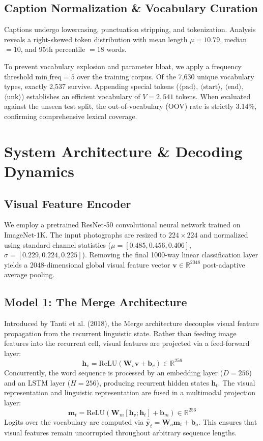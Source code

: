 \documentclass[conference]{IEEEtran}
\begin{document}
\subsection{Caption Normalization \& Vocabulary Curation}
Captions undergo lowercasing, punctuation stripping, and tokenization. Analysis reveals a right-skewed token distribution with mean length $\mu = 10.79$, median $= 10$, and 95th percentile $= 18$ words.

To prevent vocabulary explosion and parameter bloat, we apply a frequency threshold $\text{min\_freq} = 5$ over the training corpus. Of the 7,630 unique vocabulary types, exactly 2,537 survive. Appending special tokens ($\langle\text{pad}\rangle$, $\langle\text{start}\rangle$, $\langle\text{end}\rangle$, $\langle\text{unk}\rangle$) establishes an efficient vocabulary of $V = 2,541$ tokens. When evaluated against the unseen test split, the out-of-vocabulary (OOV) rate is strictly 3.14\%, confirming comprehensive lexical coverage.

\section{System Architecture \& Decoding Dynamics}
\subsection{Visual Feature Encoder}
We employ a pretrained ResNet-50 convolutional neural network trained on ImageNet-1K. The input photographs are resized to $224 \times 224$ and normalized using standard channel statistics ($\mu = [0.485, 0.456, 0.406]$, $\sigma = [0.229, 0.224, 0.225]$). Removing the final 1000-way linear classification layer yields a 2048-dimensional global visual feature vector $\mathbf{v} \in \mathbb{R}^{2048}$ post-adaptive average pooling.

\subsection{Model 1: The Merge Architecture}
Introduced by Tanti et al. (2018), the Merge architecture decouples visual feature propagation from the recurrent linguistic state. Rather than feeding image features into the recurrent cell, visual features are projected via a feed-forward layer:
\begin{equation}
\mathbf{h}_v = \text{ReLU}(\mathbf{W}_v \mathbf{v} + \mathbf{b}_v) \in \mathbb{R}^{256}
\end{equation}
Concurrently, the word sequence is processed by an embedding layer ($D=256$) and an LSTM layer ($H=256$), producing recurrent hidden states $\mathbf{h}_t$. The visual representation and linguistic representation are fused in a multimodal projection layer:
\begin{equation}
\mathbf{m}_t = \text{ReLU}(\mathbf{W}_m [\mathbf{h}_v; \mathbf{h}_t] + \mathbf{b}_m) \in \mathbb{R}^{256}
\end{equation}
Logits over the vocabulary are computed via $\hat{\mathbf{y}}_t = \mathbf{W}_o \mathbf{m}_t + \mathbf{b}_o$. This ensures that visual features remain uncorrupted throughout arbitrary sequence lengths.
\end{document}
